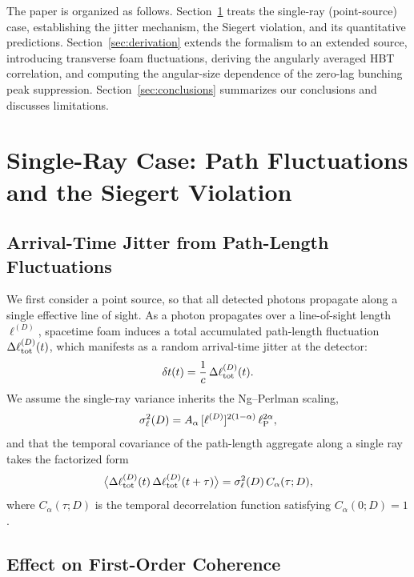 \documentclass[aps,prd,onecolumn,amsmath,amssymb]{revtex4-2}
\begin{document}
The paper is organized as follows.
Section~\ref{sec:1D} treats the single-ray (point-source) case, establishing
the jitter mechanism, the Siegert violation, and its quantitative predictions.
Section~\ref{sec:derivation} extends the formalism to an extended source,
introducing transverse foam fluctuations, deriving the angularly averaged HBT
correlation, and computing the angular-size dependence of the zero-lag bunching
peak suppression.
Section~\ref{sec:conclusions} summarizes our conclusions and discusses
limitations.

\section{Single-Ray Case: Path Fluctuations and the Siegert Violation}
\label{sec:1D}

\subsection{Arrival-Time Jitter from Path-Length Fluctuations}

We first consider a point source, so that all detected photons propagate along
a single effective line of sight.
As a photon propagates over a line-of-sight length $\ell^{(D)}$, spacetime foam
induces a total accumulated path-length fluctuation $\Delta\ell^{(D)}_{\rm tot}(t)$,
which manifests as a random arrival-time jitter at the detector:
\begin{equation}
  \delta t(t) = \frac{1}{c}\,\Delta\ell^{(D)}_{\rm tot}(t).
  \label{eq:jitter1D}
\end{equation}
We assume the single-ray variance inherits the Ng--Perlman scaling,
\begin{equation}
  \sigma_\ell^2(D) = A_\alpha\,[\ell^{(D)}]^{2(1-\alpha)}\,\ell_{\rm P}^{2\alpha},
  \label{eq:NgPerlmanVariance}
\end{equation}
and that the temporal covariance of the path-length aggregate along a single
ray takes the factorized form
\begin{equation}
  \big\langle \Delta\ell^{(D)}_{\rm tot}(t)\,
              \Delta\ell^{(D)}_{\rm tot}(t+\tau) \big\rangle
  = \sigma_\ell^2(D)\,C_\alpha(\tau;D),
  \label{eq:cov1D}
\end{equation}
where $C_\alpha(\tau;D)$ is the temporal decorrelation function satisfying
$C_\alpha(0;D)=1$.

\subsection{Effect on First-Order Coherence}
\end{document}
